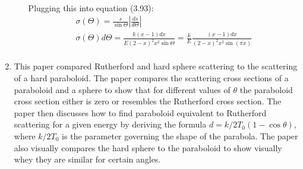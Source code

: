 \documentclass[12pt]{article}
\begin{document}
\begin{enumerate}
\begin{enumerate}
\begin{align*}
      \end{align*}
      Plugging this into equation (3.93):
      \begin{gather*}
        \sigma(\Theta)=\frac{s}{\sin\Theta}\left| \frac{ds}{d\Theta} \right|\\
        \sigma(\Theta)d\Theta=\frac{k(x-1)dx}{E(2-x)^2 x^2\sin\Theta}=\frac{k}{E}\frac{(x-1)dx}{(2-x)^2 x^2\sin(\pi x)}\\
      \end{gather*}
    \end{enumerate}
    \item This paper compared Rutherford and hard sphere scattering to the scattering of a hard paraboloid.
    The paper compares the scattering cross sections of a paraboloid and a sphere to show that for different values of $\theta$ the paraboloid cross section either is zero or resembles the Rutherford cross section.
    The paper then discusses how to find paraboloid equivalent to Rutherford scattering for a given energy by deriving the formula $d=k/2T_0(1-\cos\theta)$, where $k/2T_0$ is the parameter governing the shape of the parabola.
    The paper also visually compares the hard sphere to the paraboloid to show visually whey they are similar for certain angles.
  \end{enumerate}
\end{document}
